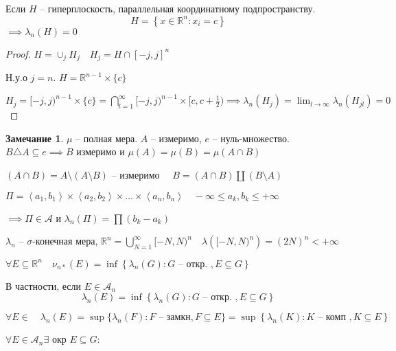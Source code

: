 \documentclass{book}
\newcommand\R{\ensuremath{\mathbb{R}}}
\theoremstyle{definition}
\newtheorem*{note}{Замечание}
\begin{document}
\begin{definition}
    Если $H$ -- гиперплоскость, параллельная координатному подпространству.  \[H = \left\{ x\in \R^n: x_i = c \right\} \] $\implies \lambda_n(H) = 0$
\end{definition}
\begin{proof}
    $H = \cup_j H_j\quad H_j = H \cap [-j,j]^n$

    Н.у.о $j = n$.  $H = \R^{n-1}\times \{c\}$

    $H_j = [-j,j)^{n-1} \times \{c\} = \bigcap\limits_{l=1} ^{\infty } [-j,j)^{n-1}\times [c,c+\frac{1}{2}) \implies \lambda_n(H_j) = \lim_{l \to \infty} \lambda_n(H_{jl}) = 0$
\end{proof}

\begin{note}
    $\mu$ -- полная мера.  $A$ -- измеримо,  $e$ -- нуль-множество.  $B \triangle A \subseteq e \implies B$ измеримо и $\mu(A) = \mu(B) = \mu(A\cap B)$ 

    $\left( A\cap B \right)  = A\setminus \left( A\setminus B \right) $ -- измеримо $\quad B = \left( A\cap B \right) \coprod \left( B \setminus A \right) $
\end{note}

\begin{statement}
    $\Pi = \left<a_1, b_1 \right> \times \left<a_2, b_2 \right>\times  \ldots \times \left<a_n, b_n \right>\quad -\infty  \leqslant a_k,b_k \leqslant +\infty $

    $\implies \Pi\in \mathcal A$ и $\lambda_n(\Pi) = \prod \left( b_k-a_k \right) $
\end{statement}

\begin{statement}
    $\lambda_n$ --  $\sigma$-конечная мера,  $\R^n = \bigcup\limits_{N=1}^{\infty}[-N, N)^n\quad \lambda\left( [-N, N)^n \right) =\left( 2N \right) ^n < +\infty  $
\end{statement}

\begin{statement}
    $\forall E\subseteq \R^n\quad \nu_{n*}(E) = \inf \left\{ \lambda_n(G): G \text{ -- откр. }, E\subseteq G \right\}$

    В частности, если $E\in \mathcal A_n$ \[\lambda_n(E) = \inf\left\{ \lambda_n(G): G \text{ -- откр. }, E\subseteq G \right\} \]
\end{statement}

\begin{statement}
    $\forall E \in \mathcal\quad \lambda_n(E) = \sup\{\lambda_n(F): F \text{ -- замкн}, F\subseteq E\} = \sup \left\{ \lambda_n(K): K \text{ -- комп }, K \subseteq E \right\} $
\end{statement}

\begin{statement}
    $\forall E \in \mathcal A_n \exists $ окр $E \subseteq G$: 
\end{statement}






























 
\end{document}
